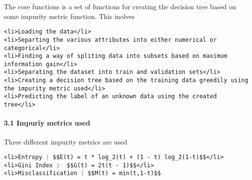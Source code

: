 \documentclass[11pt]{article}
\begin{document}
The core functions is a set of functions for creating the decision tree
based on some impurity metric function. This inolves

\begin{verbatim}
<li>Loading the data</li>
<li>Separting the various attributes into either numerical or categorical</li>
<li>Finding a way of spliting data into subsets based on maximum information gain</li>
<li>Separating the dataset into train and validation sets</li>
<li>Creating a decision tree based on the training data greedily using the impurity metric used</li>
<li>Predicting the label of an unknown data using the created tree</li>
\end{verbatim}

    \paragraph{3.1 Impuriy metrics used}\label{impuriy-metrics-used}

Three different impurity metrics are used

\begin{verbatim}
<li>Entropy : $$E(t) = t * log_2(t) + (1 - t) log_2(1-t)$$</li>
<li>Gini Index :  $$G(t) = 2t(t - 1)$$</li>
<li>Misclassification : $$M(t) = min(t,1-t)$$
\end{verbatim}
\end{document}
